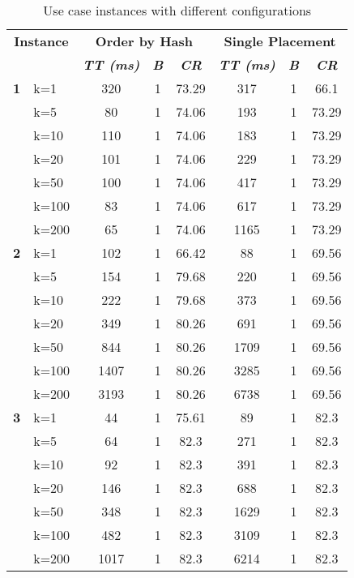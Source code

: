\begin{table}[htbp]
    \caption{Use case instances with different configurations}
    \begin{tabular}{ll|ccc|ccc}
    
    \multicolumn{ 2}{c|}{\textbf{Instance}} & \multicolumn{ 3}{c|}{\textbf{Order by Hash}} & \multicolumn{ 3}{c}{\textbf{Single Placement}} \\ 
    \multicolumn{ 2}{l|}{} & \textbf{\textit{TT (ms)}} & \textbf{\textit{B}} & \textbf{\textit{CR}} & \textbf{\textit{TT (ms)}} & \textbf{\textit{B}} & \textbf{\textit{CR}} \\ \hline
    \multicolumn{1}{r}{\textbf{1}} & k=1 & 320 & 1 & 73.29 & 317 & 1 & 66.1 \\ 
     & k=5 & 80 & 1 & 74.06 & 193 & 1 & 73.29 \\ 
     & k=10 & 110 & 1 & 74.06 & 183 & 1 & 73.29 \\ 
     & k=20 & 101 & 1 & 74.06 & 229 & 1 & 73.29 \\ 
     & k=50 & 100 & 1 & 74.06 & 417 & 1 & 73.29 \\ 
     & k=100 & 83 & 1 & 74.06 & 617 & 1 & 73.29 \\ 
     & k=200 & 65 & 1 & 74.06 & 1165 & 1 & 73.29 \\ \hline
    \multicolumn{1}{r}{\textbf{2}} & k=1 & 102 & 1 & 66.42 & 88 & 1 & 69.56 \\ 
     & k=5 & 154 & 1 & 79.68 & 220 & 1 & 69.56 \\ 
     & k=10 & 222 & 1 & 79.68 & 373 & 1 & 69.56 \\ 
     & k=20 & 349 & 1 & 80.26 & 691 & 1 & 69.56 \\ 
     & k=50 & 844 & 1 & 80.26 & 1709 & 1 & 69.56 \\ 
     & k=100 & 1407 & 1 & 80.26 & 3285 & 1 & 69.56 \\ 
     & k=200 & 3193 & 1 & 80.26 & 6738 & 1 & 69.56 \\ \hline
    \multicolumn{1}{r}{\textbf{3}} & k=1 & 44 & 1 & 75.61 & 89 & 1 & 82.3 \\ 
     & k=5 & 64 & 1 & 82.3 & 271 & 1 & 82.3 \\ 
     & k=10 & 92 & 1 & 82.3 & 391 & 1 & 82.3 \\ 
     & k=20 & 146 & 1 & 82.3 & 688 & 1 & 82.3 \\ 
     & k=50 & 348 & 1 & 82.3 & 1629 & 1 & 82.3 \\ 
     & k=100 & 482 & 1 & 82.3 & 3109 & 1 & 82.3 \\ 
     & k=200 & 1017 & 1 & 82.3 & 6214 & 1 & 82.3 \\ \hline

\end{tabular}
\end{table}
